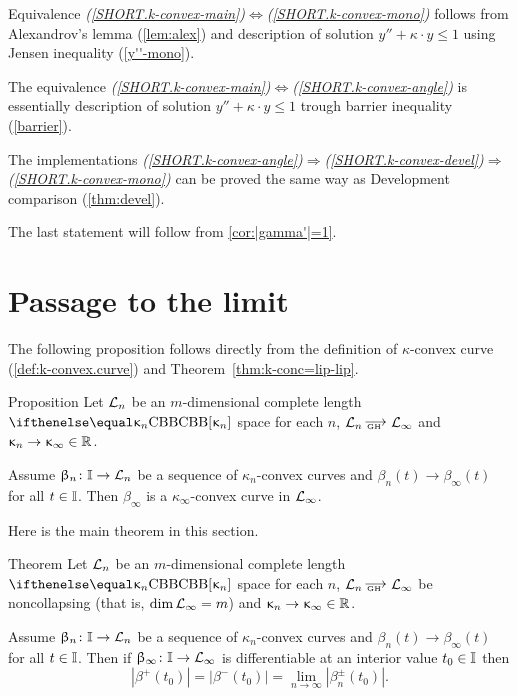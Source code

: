  Equivalence {\it (\ref{SHORT.k-convex-main})$\Leftrightarrow$(\ref{SHORT.k-convex-mono})} follows from Alexandrov's lemma (\ref{lem:alex}) and description of solution $y''+\kappa\cdot  y\le 1$ using Jensen inequality (\ref{y''-mono}).

The equivalence {\it(\ref{SHORT.k-convex-main})$\Leftrightarrow$(\ref{SHORT.k-convex-angle})} is essentially description of solution $y''+\kappa\cdot  y\le 1$ trough barrier inequality (\ref{barrier}).

The implementations {\it(\ref{SHORT.k-convex-angle})$\Rightarrow$(\ref{SHORT.k-convex-devel})$\Rightarrow$(\ref{SHORT.k-convex-mono})} can be proved the same way as Development comparison (\ref{thm:devel}).

The last statement will follow from \ref{cor:|gamma'|=1}.%
\qeds













\section{Passage to the limit}

The following proposition follows directly from the definition of $\kappa$-convex curve (\ref{def:k-convex.curve}) and Theorem~\ref{thm:k-conc=lip-lip}.

\begin{thm}{Proposition}\label{prop:lim-length}
Let 
$\mathcal{L}_n$ be an $m$-dimensional complete length $\Alex{\kappa_n}$ space for each $n$, 
$\spc{L}_n\GHto \spc{L}_\infty$
and $\kappa_n\to\kappa_\infty\in\RR$.

Assume $\beta_n\:\II\to \spc{L}_n$ be a sequence of $\kappa_n$-convex curves
and $\beta_n(t)\to \beta_\infty(t)$ for all $t\in\II$.
Then $\beta_\infty$ is a $\kappa_\infty$-convex curve in $\mathcal{L}_\infty$.
\end{thm}


Here is the main theorem in this section.

\begin{thm}{Theorem}\label{thm:lim-length}
Let 
$\mathcal{L}_n$ be an $m$-dimensional complete length $\Alex{\kappa_n}$ space for each $n$, 
$\spc{L}_n\GHto \spc{L}_\infty$ be noncollapsing (that is, $\mathop{\rm dim}\nolimits\mathcal{L}_\infty=m$)
and $\kappa_n\to\kappa_\infty\in\RR$.

Assume $\beta_n\:\II\to \spc{L}_n$ be a sequence of $\kappa_n$-convex curves
and $\beta_n(t)\to \beta_\infty(t)$ for all $t\in\II$.
Then if $\beta_\infty\:\II\to\spc{L}_\infty$ is differentiable at an interior value $t_0\in\II$
then 
\[|\beta^+(t_0)|=|\beta^-(t_0)|=\lim_{n\to\infty} |\beta_n^\pm(t_0)|.\]

\end{thm}



